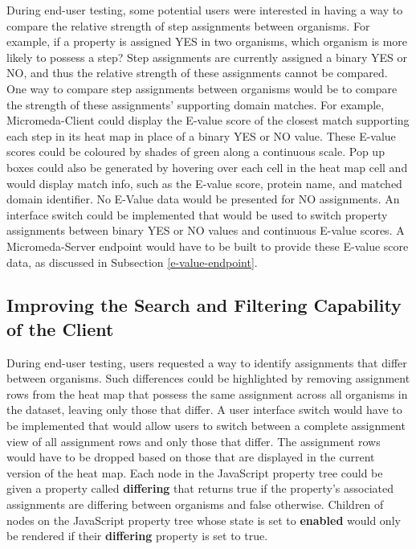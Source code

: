 During end-user testing, some potential users were interested in having a way to compare the relative strength of step assignments between organisms. For example, if a property is assigned YES in two organisms, which organism is more likely to possess a step? Step assignments are currently assigned a binary YES or NO, and thus the relative strength of these assignments cannot be compared. One way to compare step assignments between organisms would be to compare the strength of these assignments' supporting domain matches. For example, Micromeda-Client could display the E-value score of the closest match supporting each step in its heat map in place of a binary YES or NO value. These E-value scores could be coloured by shades of green along a continuous scale. Pop up boxes could also be generated by hovering over each cell in the heat map cell and would display match info, such as the E-value score, protein name, and matched domain identifier. No E-Value data would be presented for NO assignments. An interface switch could be implemented that would be used to switch property assignments between binary YES or NO values and continuous E-value scores. A Micromeda-Server endpoint would have to be built to provide these E-value score data, as discussed in Subsection \ref{e-value-endpoint}.

\subsection{Improving the Search and Filtering Capability of the Client}

During end-user testing, users requested a way to identify assignments that differ between organisms. Such differences could be highlighted by removing assignment rows from the heat map that possess the same assignment across all organisms in the dataset, leaving only those that differ. A user interface switch would have to be implemented that would allow users to switch between a complete assignment view of all assignment rows and only those that differ. The assignment rows would have to be dropped based on those that are displayed in the current version of the heat map. Each node in the JavaScript property tree could be given a property called \textbf{differing} that returns true if the property's associated assignments are differing between organisms and false otherwise. Children of nodes on the JavaScript property tree whose state is set to \textbf{enabled} would only be rendered if their \textbf{differing} property is set to true.

